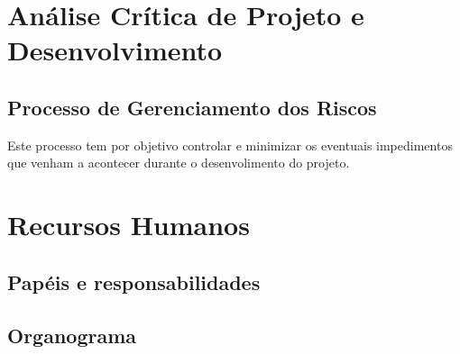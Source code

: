 \section{Análise Crítica de Projeto e Desenvolvimento}

\subsection{Processo de Gerenciamento dos Riscos}
    Este processo tem por objetivo controlar e minimizar os eventuais impedimentos que venham a acontecer durante o desenvolimento do projeto.

\section{Recursos Humanos}
\subsection{Papéis e responsabilidades}

\subsection{Organograma}    

    
    

